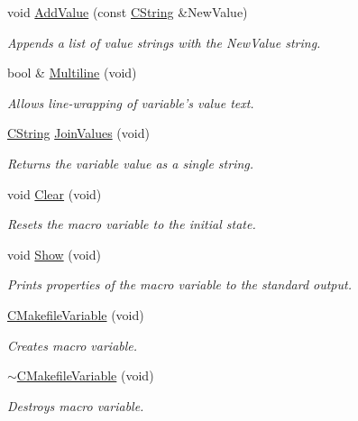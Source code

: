\begin{DoxyCompactItemize}
void \hyperlink{classCMakefileVariable_ab6da5ff7718f4f72c62c7f788bd89688}{Add\-Value} (const \hyperlink{classCString}{C\-String} \&New\-Value)
\begin{DoxyCompactList}\small\item\em Appends a list of value strings with the {\itshape New\-Value} string. \end{DoxyCompactList}\item 
bool \& \hyperlink{classCMakefileVariable_a59addb2aafefc582adea0282f6345855}{Multiline} (void)
\begin{DoxyCompactList}\small\item\em Allows line-\/wrapping of variable's value text. \end{DoxyCompactList}\item 
\hyperlink{classCString}{C\-String} \hyperlink{classCMakefileVariable_a627138c1aed54cb0c94dba4d89c06a4f}{Join\-Values} (void)
\begin{DoxyCompactList}\small\item\em Returns the variable value as a single string. \end{DoxyCompactList}\item 
void \hyperlink{classCMakefileVariable_a2443c9fd387bc8e35bf3410363c8efcd}{Clear} (void)
\begin{DoxyCompactList}\small\item\em Resets the macro variable to the initial state. \end{DoxyCompactList}\item 
void \hyperlink{classCMakefileVariable_a52aee3c1d3fc4c93392188ec3ec8a642}{Show} (void)
\begin{DoxyCompactList}\small\item\em Prints properties of the macro variable to the standard output. \end{DoxyCompactList}\item 
\hyperlink{classCMakefileVariable_a28e3a72b6a57eb5770f1977d5f80c8b7}{C\-Makefile\-Variable} (void)
\begin{DoxyCompactList}\small\item\em Creates macro variable. \end{DoxyCompactList}\item 
\hyperlink{classCMakefileVariable_ad61d15738e7073a5fd00e58d13d17ab9}{$\sim$\-C\-Makefile\-Variable} (void)
\begin{DoxyCompactList}\small\item\em Destroys macro variable. \end{DoxyCompactList}\end{DoxyCompactItemize}
